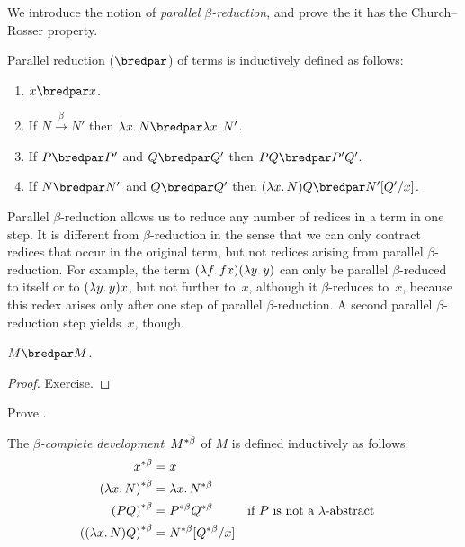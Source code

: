 \documentclass[../../../include/open-logic-section]{subfiles}
\begin{document}


We introduce the notion of \emph{parallel $\beta$-reduction}, and
prove the it has the Church--Rosser property.

\begin{defn} 
  Parallel reduction ($\bredpar$) of terms is inductively defined as follows:
  \begin{enumerate}
    \item {} $x \bredpar x$.
    \item {} If $N \xrightarrow{\beta} N'$ then $\lambd[x][N] \bredpar
      \lambd[x][N']$.
    \item {} If $P \bredpar P'$ and $Q \bredpar Q'$ then $PQ \bredpar
      P'Q'$.
    \item {} If $N \bredpar N'$ and $Q \bredpar Q'$ then
      $(\lambd[x][N])Q \bredpar \Subst{N'}{Q'}{x}$.
  \end{enumerate}
\end{defn}

Parallel $\beta$-reduction allows us to reduce any number of redices in a
term in one step. It is different from $\beta$-reduction in the sense that we
can only contract redices that occur in the original term, but not redices
arising from parallel $\beta$-reduction. For example, the term
$(\lambd[f][fx])(\lambd[y][y])$ can only be parallel $\beta$-reduced
to itself or to $(\lambd[y][y])x$, but not further to~$x$, although it
$\beta$-reduces to~$x$, because this redex arises only after one step 
of parallel $\beta$-reduction. A second parallel $\beta$-reduction
step yields~$x$, though.

\begin{thm}
  $M \bredpar M$.
\end{thm}

\begin{proof}
  Exercise.
\end{proof}

\begin{prob}
  Prove .
\end{prob}

\begin{defn}
  The \emph{$\beta$-complete development}~$\bcd{M}$ of $M$ is defined
  inductively as follows:
  \begin{align}
    \bcd{x} &= x \ollabel{defn:bcd1} \\
    \bcd{(\lambd[x][N])} &= \lambd[x][\bcd{N}] \ollabel{defn:bcd2}\\
    \bcd{(PQ)} &= \bcd{P}\bcd{Q} && \text{if $P$ is not a $\lambd$-abstract} 
    \ollabel{defn:bcd3} \\
    \bcd{((\lambd[x][N])Q)} &= \Subst{\bcd{N}}{\bcd{Q}}{x} \ollabel{defn:bcd4}
  \end{align}
\end{defn}
\end{document}
